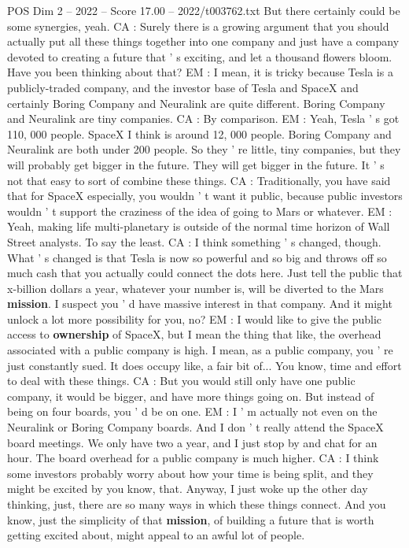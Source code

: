 \begin{textsample}{POS Dim 2 – 2022 – Score 17.00 – 2022/t003762.txt}
But there certainly could be some synergies, yeah.
CA : Surely there is a growing argument that you should actually put all these things together into one company and just have a company devoted to creating a future that ' s exciting, and let a thousand flowers bloom.
Have you been thinking about that?
EM : I mean, it is tricky because Tesla is a publicly-traded company, and the investor base of Tesla and SpaceX and certainly Boring Company and Neuralink are quite different.
Boring Company and Neuralink are tiny companies.
CA : By comparison.
EM : Yeah, Tesla ' s got 110, 000 people.
SpaceX I think is around 12, 000 people.
Boring Company and Neuralink are both under 200 people.
So they ' re little, tiny companies, but they will probably get bigger in the future.
They will get bigger in the future.
It ' s not that easy to sort of combine these things.
CA : Traditionally, you have said that for SpaceX especially, you wouldn ' t want it public, because public investors wouldn ' t support the craziness of the idea of going to Mars or whatever.
EM : Yeah, making life multi-planetary is outside of the normal time horizon of Wall Street analysts.
To say the least.
CA : I think something ' s changed, though.
What ' s changed is that Tesla is now so powerful and so big and throws off so much cash that you actually could connect the dots here.
Just tell the public that x-billion dollars a year, whatever your number is, will be diverted to the Mars \textbf{mission}.
I suspect you ' d have massive interest in that company.
And it might unlock a lot more possibility for you, no?
EM : I would like to give the public access to \textbf{ownership} of SpaceX, but I mean the thing that like, the overhead associated with a public company is high.
I mean, as a public company, you ' re just constantly sued.
It does occupy like, a fair bit of...
You know, time and effort to deal with these things.
CA : But you would still only have one public company, it would be bigger, and have more things going on.
But instead of being on four boards, you ' d be on one.
EM : I ' m actually not even on the Neuralink or Boring Company boards.
And I don ' t really attend the SpaceX board meetings.
We only have two a year, and I just stop by and chat for an hour.
The board overhead for a public company is much higher.
CA : I think some investors probably worry about how your time is being split, and they might be excited by you know, that.
Anyway, I just woke up the other day thinking, just, there are so many ways in which these things connect.
And you know, just the simplicity of that \textbf{mission}, of building a future that is worth getting excited about, might appeal to an awful lot of people.

\end{textsample}
